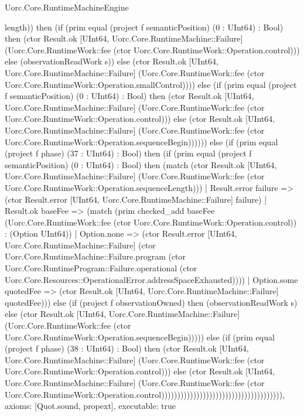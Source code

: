 \begin{lexlean}{Uorc.Core.RuntimeMachineEngine}
\begin{semanticmodule}
{length)) then (if (prim equal (project f semanticPosition) (0 : UInt64) : Bool) then (ctor Result.ok [UInt64, Uorc.Core.RuntimeMachine::Failure] (Uorc.Core.RuntimeWork::fee (ctor Uorc.Core.RuntimeWork::Operation.control))) else (observationReadWork s)) else (ctor Result.ok [UInt64, Uorc.Core.RuntimeMachine::Failure] (Uorc.Core.RuntimeWork::fee (ctor Uorc.Core.RuntimeWork::Operation.smallControl)))) else (if (prim equal (project f semanticPosition) (0 : UInt64) : Bool) then (ctor Result.ok [UInt64, Uorc.Core.RuntimeMachine::Failure] (Uorc.Core.RuntimeWork::fee (ctor Uorc.Core.RuntimeWork::Operation.control))) else (ctor Result.ok [UInt64, Uorc.Core.RuntimeMachine::Failure] (Uorc.Core.RuntimeWork::fee (ctor Uorc.Core.RuntimeWork::Operation.sequenceBegin)))))) else (if (prim equal (project f phase) (37 : UInt64) : Bool) then (if (prim equal (project f semanticPosition) (0 : UInt64) : Bool) then (match (ctor Result.ok [UInt64, Uorc.Core.RuntimeMachine::Failure] (Uorc.Core.RuntimeWork::fee (ctor Uorc.Core.RuntimeWork::Operation.sequenceLength)))
      | Result.error failure => (ctor Result.error [UInt64, Uorc.Core.RuntimeMachine::Failure] failure)
      | Result.ok baseFee => (match (prim checked_add baseFee (Uorc.Core.RuntimeWork::fee (ctor Uorc.Core.RuntimeWork::Operation.control)) : (Option UInt64))
        | Option.none => (ctor Result.error [UInt64, Uorc.Core.RuntimeMachine::Failure] (ctor Uorc.Core.RuntimeMachine::Failure.program (ctor Uorc.Core.RuntimeProgram::Failure.operational (ctor Uorc.Core.Resources::OperationalError.addressSpaceExhausted))))
        | Option.some quotedFee => (ctor Result.ok [UInt64, Uorc.Core.RuntimeMachine::Failure] quotedFee))) else (if (project f observationOwned) then (observationReadWork s) else (ctor Result.ok [UInt64, Uorc.Core.RuntimeMachine::Failure] (Uorc.Core.RuntimeWork::fee (ctor Uorc.Core.RuntimeWork::Operation.sequenceBegin))))) else (if (prim equal (project f phase) (38 : UInt64) : Bool) then (ctor Result.ok [UInt64, Uorc.Core.RuntimeMachine::Failure] (Uorc.Core.RuntimeWork::fee (ctor Uorc.Core.RuntimeWork::Operation.control))) else (ctor Result.ok [UInt64, Uorc.Core.RuntimeMachine::Failure] (Uorc.Core.RuntimeWork::fee (ctor Uorc.Core.RuntimeWork::Operation.control)))))))))))))))))))))))))))))))))))))),
  axioms: [Quot.sound, propext],
  executable: true
}


\end{semanticmodule}
\end{lexlean}
